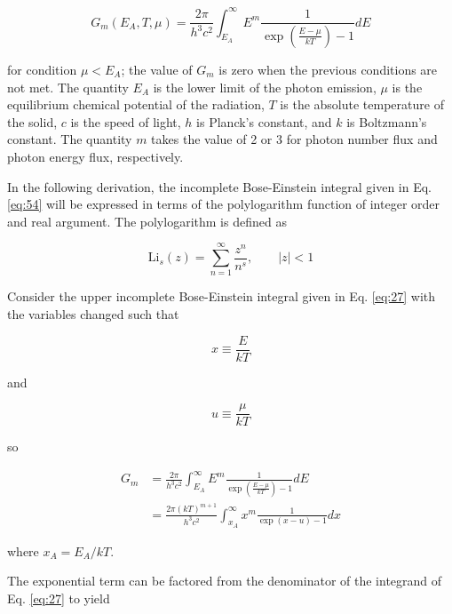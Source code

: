 \documentclass[letterpaper,12pt]{article}
\newcommand{\Li}{\textrm{Li}}
\begin{document}
\begin{equation} \label{eq:54}
G_{m}(E_{A},T,\mu) = \frac{2 \pi}{h^{3}c^{2}} \int_{E_{A}}^{\infty} E^{m} \frac{1}{\exp \left( \frac{E - \mu}{kT} \right) - 1} dE 
\end{equation}

\noindent for condition $\mu < E_{A}$; the value of $G_{m}$ is zero when the previous conditions are not met. The quantity $E_{A}$ is the lower limit of the photon emission, $\mu$ is the equilibrium chemical potential of the radiation, $T$ is the absolute temperature of the solid, $c$ is the speed of light, $h$ is Planck's constant, and $k$ is Boltzmann's constant. The quantity $m$ takes the value of 2 or 3 for photon number flux and photon energy flux, respectively.

In the following derivation, the incomplete Bose-Einstein integral given in Eq. \ref{eq:54} will be expressed in terms of the polylogarithm function of integer order and real argument. The polylogarithm is defined as

\begin{equation} \label{eq:22}
\Li_{s}(z) = \sum_{n = 1}^{\infty} \frac{z^{n}}{n^{s}}, \qquad |z| < 1
\end{equation}

Consider the upper incomplete Bose-Einstein integral given in Eq. \ref{eq:27} with the variables changed such that

\begin{equation} \label{eq:28}
x \equiv \frac{E}{kT}
\end{equation}

\noindent and

\begin{equation} \label{eq:29}
u \equiv \frac{\mu}{kT}
\end{equation}

\noindent so

\begin{align} \label{eq:27}
G_{m} &= \frac{2 \pi}{h^{3}c^{2}} \int_{E_{A}}^{\infty} E^{m} \frac{1}{\exp \left( \frac{E - \mu}{kT} \right) - 1} dE \nonumber \\
 &= \frac{2 \pi (kT)^{m+1}}{h^{3}c^{2}} \int_{x_{A}}^{\infty} x^{m} \frac{1}{\exp(x-u) - 1} dx
\end{align}

\noindent where $x_{A} = E_{A}/kT$.

The exponential term can be factored from the denominator of the integrand of Eq. \ref{eq:27} to yield
\end{document}
